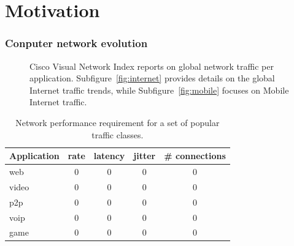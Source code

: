 \section{Motivation} \label{sec:intro:motivations}

\subsubsection*{Conputer network evolution}

\begin{figure}[ht] \centering {}
  \caption{Cisco Visual Network Index reports on global network traffic per
    application. Subfigure~\ref{fig:internet} provides details on the global
    Internet traffic trends, while Subfigure~\ref{fig:mobile} focuses on Mobile
    Internet traffic.} \label{fig:internet_applications} \end{figure}


\begin{table} \begin{center} \begin{tabular}{ | l | c c c c | } \hline
      Application  & rate & latency & jitter  & \# connections \\ \hline web
      & 0    & 0       & 0      & 0\\ video        & 0    & 0       & 0      &
      0\\ p2p          & 0    & 0       & 0      & 0\\ voip         & 0    & 0
      & 0      & 0\\ game         & 0    & 0       & 0      & 0\\ \hline
    \end{tabular} \end{center} \caption{Network performance requirement for a
    set of popular traffic classes.} \label{tbl:application_requirement}
\end{table}




